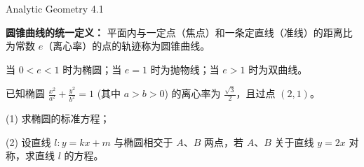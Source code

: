 \documentclass{ctexart}
\begin{document}
\thispagestyle{fancy}

\begin{center}
    \begin{chaptertitle}{\faBookOpen}{Analytic Geometry 4.1}
    \end{chaptertitle}
\end{center}


\begin{theorembox}{4.1}
\textbf{圆锥曲线的统一定义：} 平面内与一定点（焦点）和一条定直线（准线）的距离比为常数 $e$（离心率）的点的轨迹称为圆锥曲线。

当 $0 < e < 1$ 时为椭圆；当 $e = 1$ 时为抛物线；当 $e > 1$ 时为双曲线。
\end{theorembox}

\begin{exercisebox}{4.1}
已知椭圆 $\frac{x^2}{a^2} + \frac{y^2}{b^2} = 1$ (其中 $a > b > 0$) 的离心率为 $\frac{\sqrt{3}}{2}$，且过点 $(2, 1)$。

(1) 求椭圆的标准方程；

(2) 设直线 $l: y = kx + m$ 与椭圆相交于 $A$、$B$ 两点，若 $A$、$B$ 关于直线 $y = 2x$ 对称，求直线 $l$ 的方程。
\end{exercisebox}
\end{document}

